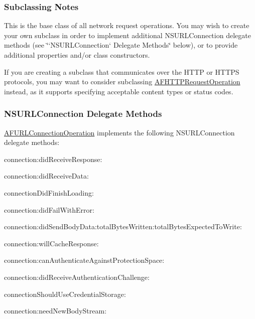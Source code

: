 \subsubsection*{Subclassing Notes}

This is the base class of all network request operations. You may wish to create your own subclass in order to implement additional {\ttfamily N\-S\-U\-R\-L\-Connection} delegate methods (see \char`\"{}`\-N\-S\-U\-R\-L\-Connection` Delegate Methods\char`\"{} below), or to provide additional properties and/or class constructors.

If you are creating a subclass that communicates over the H\-T\-T\-P or H\-T\-T\-P\-S protocols, you may want to consider subclassing {\ttfamily \hyperlink{interface_a_f_h_t_t_p_request_operation}{A\-F\-H\-T\-T\-P\-Request\-Operation}} instead, as it supports specifying acceptable content types or status codes.

\subsubsection*{N\-S\-U\-R\-L\-Connection Delegate Methods}

{\ttfamily \hyperlink{interface_a_f_u_r_l_connection_operation}{A\-F\-U\-R\-L\-Connection\-Operation}} implements the following {\ttfamily N\-S\-U\-R\-L\-Connection} delegate methods\-:


\begin{DoxyItemize}
\item {\ttfamily connection\-:did\-Receive\-Response\-:}
\item {\ttfamily connection\-:did\-Receive\-Data\-:}
\item {\ttfamily connection\-Did\-Finish\-Loading\-:}
\item {\ttfamily connection\-:did\-Fail\-With\-Error\-:}
\item {\ttfamily connection\-:did\-Send\-Body\-Data\-:total\-Bytes\-Written\-:total\-Bytes\-Expected\-To\-Write\-:}
\item {\ttfamily connection\-:will\-Cache\-Response\-:}
\item {\ttfamily connection\-:can\-Authenticate\-Against\-Protection\-Space\-:}
\item {\ttfamily connection\-:did\-Receive\-Authentication\-Challenge\-:}
\item {\ttfamily connection\-Should\-Use\-Credential\-Storage\-:}
\item {\ttfamily connection\-:need\-New\-Body\-Stream\-:}
\end{DoxyItemize}

